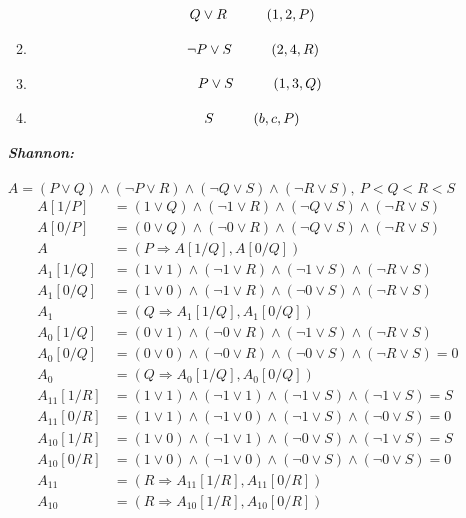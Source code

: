 \documentclass[a4paper,12pt]{article}
\newcommand\tab[1][1cm]{\hspace*{#1}}
\begin{document}
\begin{enumerate}
\begin{multicols}{2}
\begin{enumerate}
\begin{align*}
				Q\lor R\tab &(1,2,P)
			\end{align*}
			\item \begin{align*}
				\neg P\lor S\tab & (2,4,R) 
			\end{align*}
			\item \begin{align*}
				P\lor S\tab (1,3,Q)
			\end{align*}
			\item \begin{align*}
				S\tab & (b,c,P)
			\end{align*}
		\end{enumerate}
	\end{multicols}
	\emph{\textbf{Shannon:}}\\\\
	$A=(P\lor Q)\land(\neg P\lor R)\land(\neg Q\lor S)\land (\neg R\lor S),\>P<Q<R<S$
	\begin{align*}
		A[1/P]&=(1\lor Q)\land(\neg 1\lor R)\land(\neg Q\lor S)\land (\neg R\lor S)\\
		A[0/P]&=(0\lor Q)\land(\neg 0\lor R)\land(\neg Q\lor S)\land (\neg R\lor S)\\
		A&=(P\Rightarrow A[1/Q],A[0/Q])\\
		A_1[1/Q]&=(1\lor 1)\land(\neg 1\lor R)\land(\neg 1\lor S)\land (\neg R\lor S)\\
		A_1[0/Q]&=(1\lor 0)\land(\neg 1\lor R)\land(\neg 0\lor S)\land (\neg R\lor S)\\
		A_1&=(Q\Rightarrow A_1[1/Q],A_1[0/Q])\\
		A_0[1/Q]&=(0\lor 1)\land(\neg 0\lor R)\land(\neg 1\lor S)\land (\neg R\lor S)\\
		A_0[0/Q]&=(0\lor 0)\land(\neg 0\lor R)\land(\neg 0\lor S)\land (\neg R\lor S)=0\\
		A_0&=(Q\Rightarrow A_0[1/Q],A_0[0/Q])\\
		A_{11}[1/R]&=(1\lor 1)\land(\neg 1\lor 1)\land(\neg 1\lor S)\land (\neg 1\lor S)=S\\
		A_{11}[0/R]&=(1\lor 1)\land(\neg 1\lor 0)\land(\neg 1\lor S)\land (\neg 0\lor S)=0\\
		A_{10}[1/R]&=(1\lor 0)\land(\neg 1\lor 1)\land(\neg 0\lor S)\land (\neg 1\lor S)=S\\
		A_{10}[0/R]&=(1\lor 0)\land(\neg 1\lor 0)\land(\neg 0\lor S)\land (\neg 0\lor S)=0\\
		A_{11}&=(R\Rightarrow A_{11}[1/R],A_{11}[0/R])\\
		A_{10}&=(R\Rightarrow A_{10}[1/R],A_{10}[0/R])\\

\end{align*}
\end{enumerate}
\end{document}

